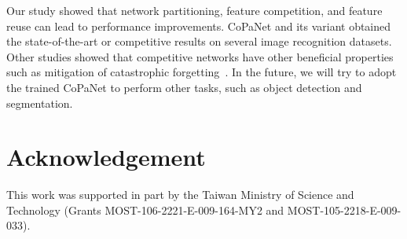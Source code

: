 \documentclass[wcp]{jmlr}
\begin{document}
Our study showed that network partitioning, feature competition, and feature reuse can lead to performance improvements.
CoPaNet and its variant obtained the state-of-the-art or competitive results on several image recognition datasets.
Other studies showed that competitive networks have other beneficial properties such as mitigation of catastrophic forgetting~\citep{srivastava2013compete}.
In the future, we will try to adopt the trained CoPaNet to perform other tasks, such as object detection and segmentation.

\section*{Acknowledgement}
This work was supported in part by the Taiwan Ministry of Science and Technology (Grants MOST-106-2221-E-009-164-MY2 and MOST-105-2218-E-009-033). 


\end{document}
